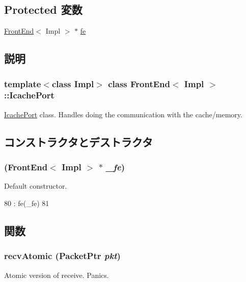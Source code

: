 \subsection*{Protected 変数}
\begin{DoxyCompactItemize}
\item 
\hyperlink{classFrontEnd}{FrontEnd}$<$ Impl $>$ $\ast$ \hyperlink{classFrontEnd_1_1IcachePort_a639e39cd16b0e1d657b223db6f848764}{fe}
\end{DoxyCompactItemize}


\subsection{説明}
\subsubsection*{template$<$class Impl$>$ class FrontEnd$<$ Impl $>$::IcachePort}

\hyperlink{classFrontEnd_1_1IcachePort}{IcachePort} class. Handles doing the communication with the cache/memory. 

\subsection{コンストラクタとデストラクタ}
\hypertarget{classFrontEnd_1_1IcachePort_abd888d3a6cea286340ce6aded692b1cc}{
\subsubsection[{IcachePort}]{ ({\bf FrontEnd}$<$ Impl $>$ $\ast$ {\em \_\-fe})}}
\label{classFrontEnd_1_1IcachePort_abd888d3a6cea286340ce6aded692b1cc}
Default constructor. 


\begin{DoxyCode}
80             : fe(_fe)
81         { }
\end{DoxyCode}


\subsection{関数}
\hypertarget{classFrontEnd_1_1IcachePort_a5f0b4c4a94f6b0053f9d7a4eb9c2518a}{
\subsubsection[{recvAtomic}]{ recvAtomic ({\bf PacketPtr} {\em pkt})}}
\label{classFrontEnd_1_1IcachePort_a5f0b4c4a94f6b0053f9d7a4eb9c2518a}
Atomic version of receive. Panics. 



